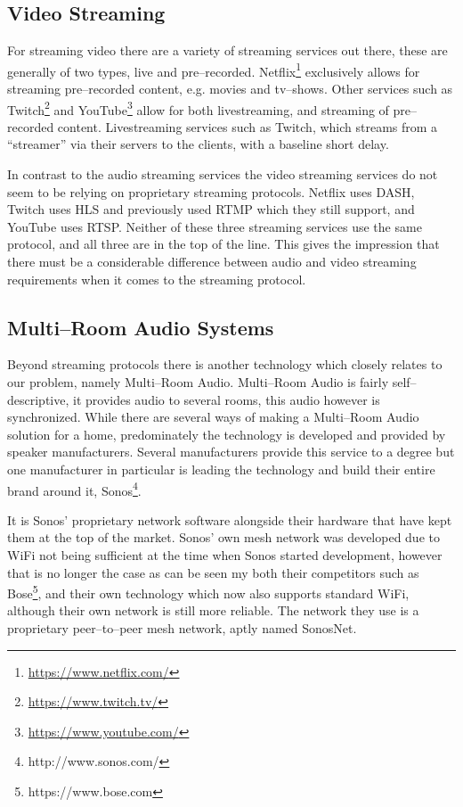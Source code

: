 \subsection{Video Streaming}
For streaming video there are a variety of streaming services out there, these are generally of two types, live and pre--recorded.
Netflix\footnote{\url{https://www.netflix.com/}} exclusively allows for streaming pre--recorded content, e.g. movies and tv--shows.
Other services such as Twitch\footnote{\url{https://www.twitch.tv/}} and YouTube\footnote{\url{https://www.youtube.com/}} allow for both livestreaming, and streaming of pre--recorded content.
Livestreaming services such as Twitch, which streams from a ``streamer'' via their servers to the clients, with a baseline short delay.

In contrast to the audio streaming services the video streaming services do not seem to be relying on proprietary streaming protocols.
Netflix uses \ac{DASH}, Twitch uses \ac{HLS} and previously used \ac{RTMP} which they still support, and YouTube uses \ac{RTSP}.\cite{netflix}\cite{twitch}\cite{youtube}
Neither of these three streaming services use the same protocol, and all three are in the top of the line.
This gives the impression that there must be a considerable difference between audio and video streaming requirements when it comes to the streaming protocol.

\subsection{Multi--Room Audio Systems}
Beyond streaming protocols there is another technology which closely relates to our problem, namely Multi--Room Audio.
Multi--Room Audio is fairly self--descriptive, it provides audio to several rooms, this audio however is synchronized.
While there are several ways of making a Multi--Room Audio solution for a home, predominately the technology is developed and provided by speaker manufacturers.
Several manufacturers provide this service to a degree but one manufacturer in particular is leading the technology and build their entire brand around it, Sonos\footnote{http://www.sonos.com/}.

It is Sonos' proprietary network software alongside their hardware that have kept them at the top of the market.
Sonos' own mesh network was developed due to WiFi not being sufficient at the time when Sonos started development, however that is no longer the case as can be seen my both their competitors such as Bose\footnote{https://www.bose.com}, and their own technology which now also supports standard WiFi, although their own network is still more reliable.\cite{sonos1}
The network they use is a proprietary peer--to--peer mesh network, aptly named SonosNet.\cite{sonosWiki}


